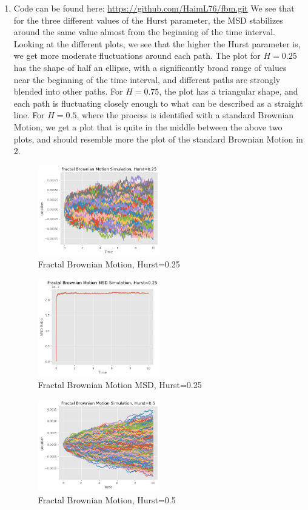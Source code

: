 \documentclass{article}
\begin{document}
\begin{enumerate}
\item Code can be found here: \url{https://github.com/HaimL76/fbm.git}
We see that for the three different values of the Hurst parameter, the MSD stabilizes around the same value almost from the beginning of the time interval. Looking at the different plots, we see that the higher the Hurst parameter is, we get more moderate fluctuations around each path. The plot for $H=0.25$ has the shape of half an ellipse, with a significantly broad range of values near the beginning of the time interval, and different paths are strongly blended into other paths. For $H=0.75$, the plot has a triangular shape, and each path is fluctuating closely enough to what can be described as a straight line. For $H=0.5$, where the process is identified with a standard Brownian Motion, we get a plot that is quite in the middle between the above two plots, and should resemble more the plot of the standard Brownian Motion in 2.
\begin{figure}[h]
\caption{Fractal Brownian Motion, Hurst=0.25}
\centering
\includegraphics[width=0.5\textwidth]{fractal_brownian_motion_simulation_0.25.png}
\end{figure}
\begin{figure}[h]
\caption{Fractal Brownian Motion MSD, Hurst=0.25}
\centering
\includegraphics[width=0.5\textwidth]{fbm_msd_0.25.png}
\end{figure}
\begin{figure}[h]
\caption{Fractal Brownian Motion, Hurst=0.5}
\centering
\includegraphics[width=0.5\textwidth]{fractal_brownian_motion_simulation_0.5.png}

\end{figure}
\end{enumerate}
\end{document}
